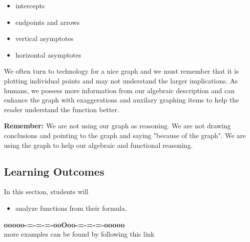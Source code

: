 \documentclass{ximera}
\begin{document}
\begin{itemize}
	\item intercepts
	\item endpoints and arrows
	\item vertical asymptotes
	\item horizontal asymptotes
\end{itemize}




We often turn to technology for a nice graph and we must remember that it is plotting individual points and may not understand the larger implications. As humans, we possess more information from our algebraic description and can enhance the graph with exaggerations and auxilary graphing items to help the reader understand the function better.





\textbf{\textcolor{red!80!black}{Remember: }}  We are not using our graph as reasoning.  We are not drawing conclusions and pointing to the graph and saying "because of the graph".  We are using the graph to help our algebraic and functional reasoning.


\subsection*{Learning Outcomes}


\begin{sectionOutcomes}
In this section, students will 

\begin{itemize}
\item analyze functions from their formula.
\end{itemize}
\end{sectionOutcomes}











\begin{center}
\textbf{\textcolor{green!50!black}{ooooo-=-=-=-ooOoo-=-=-=-ooooo}} \\

more examples can be found by following this link\\ 

\end{center}
\end{document}
